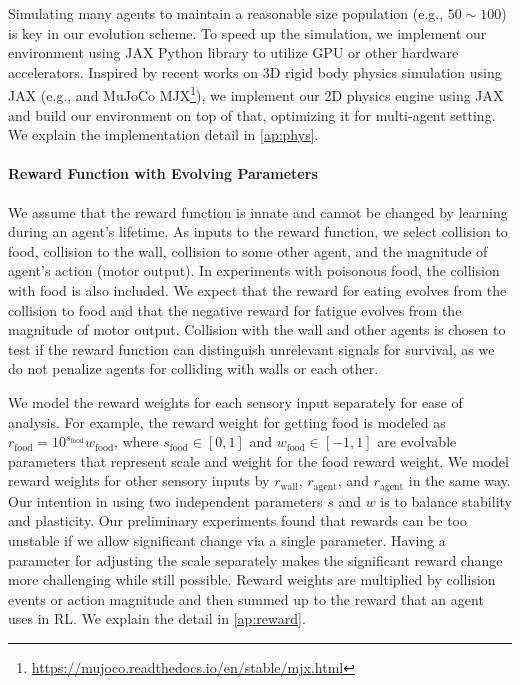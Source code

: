 Simulating many agents to maintain a reasonable size population (e.g., $50\sim 100$) is key in our evolution scheme. To speed up the simulation, we implement our environment using JAX Python library \citep{jax2018github} to utilize GPU or other hardware accelerators. Inspired by recent works on 3D rigid body physics simulation using JAX (e.g., \citet{brax2021github} and MuJoCo \citep{todorov2012mujoco} MJX\footnote{\url{https://mujoco.readthedocs.io/en/stable/mjx.html}}), we implement our 2D physics engine using JAX and build our environment on top of that, optimizing it for multi-agent setting. We explain the implementation detail in \cref{ap:phys}.

\paragraph{Reward Function with Evolving Parameters}
We assume that the reward function is innate and cannot be changed by learning during an agent's lifetime. As inputs to the reward function, we select  collision to food,  collision to the wall,  collision to some other agent, and  the magnitude of agent's action (motor output). In experiments with poisonous food, the collision with food is also included. We expect that the reward for eating evolves from the collision to food and that the negative reward for fatigue evolves from the magnitude of motor output. Collision with the wall and other agents is chosen to test if the reward function can distinguish unrelevant signals for survival, as we do not penalize agents for colliding with walls or each other.

We model the reward weights for each sensory input separately for ease of analysis. For example, the reward weight for getting food is modeled as $r_{\mathrm{food}} = 10^{s_{\mathrm{food}}} w_{\mathrm{food}}$, where $s_{\mathrm{food}} \in [0, 1]$ and $w_{\mathrm{food}} \in [-1, 1]$ are evolvable parameters that represent scale and weight for the food reward weight. We model reward weights for other sensory inputs by $r_\mathrm{wall}$, $r_\mathrm{agent}$, and $r_\mathrm{agent}$ in the same way. Our intention in using two independent parameters $s$ and $w$ is to balance stability and plasticity. Our preliminary experiments found that rewards can be too unstable if we allow significant change via a single parameter. Having a parameter for adjusting the scale separately makes the significant reward change more challenging while still possible. Reward weights are multiplied by collision events or action magnitude and then summed up to the reward that an agent uses in RL. We explain the detail in \cref{ap:reward}.

